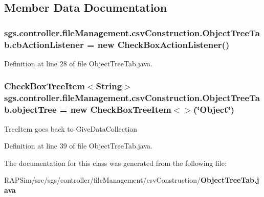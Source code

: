\subsection{Member Data Documentation}
\subsubsection[{cb\-Action\-Listener}]{ sgs.\-controller.\-file\-Management.\-csv\-Construction.\-Object\-Tree\-Tab.\-cb\-Action\-Listener = new {\bf Check\-Box\-Action\-Listener}()}\label{classsgs_1_1controller_1_1file_management_1_1csv_construction_1_1_object_tree_tab_a9ff325bbcbe0e75b4eabccea336bcdd1}


Definition at line 28 of file Object\-Tree\-Tab.\-java.

\subsubsection[{object\-Tree}]{\setlength{\rightskip}{0pt plus 5cm}Check\-Box\-Tree\-Item$<$String$>$ sgs.\-controller.\-file\-Management.\-csv\-Construction.\-Object\-Tree\-Tab.\-object\-Tree = new Check\-Box\-Tree\-Item$<$$>$(\char`\"{}Object\char`\"{})}\label{classsgs_1_1controller_1_1file_management_1_1csv_construction_1_1_object_tree_tab_ac349a86002c511fe5a66bd880872ca85}
Tree\-Item goes back to Give\-Data\-Collection 

Definition at line 39 of file Object\-Tree\-Tab.\-java.



The documentation for this class was generated from the following file\-:\begin{DoxyCompactItemize}
\item 
R\-A\-P\-Sim/src/sgs/controller/file\-Management/csv\-Construction/{\bf Object\-Tree\-Tab.\-java}\end{DoxyCompactItemize}
